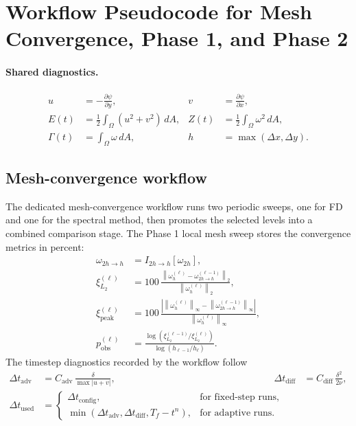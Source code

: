 \documentclass[11pt]{article}
\begin{document}
\section*{Workflow Pseudocode for Mesh Convergence, Phase 1, and Phase 2}

\paragraph{Shared diagnostics.}
\begin{align}
u &= -\frac{\partial \psi}{\partial y},
&
v &= \frac{\partial \psi}{\partial x},
\\
E(t) &= \frac{1}{2}\int_{\Omega}\left(u^2 + v^2\right)\,dA,
&
Z(t) &= \frac{1}{2}\int_{\Omega}\omega^2\,dA,
\\
\Gamma(t) &= \int_{\Omega}\omega\,dA,
&
h &= \max(\Delta x,\Delta y).
\end{align}

\subsection*{Mesh-convergence workflow}

The dedicated mesh-convergence workflow runs two periodic sweeps, one for FD and one for the spectral method, then promotes the selected levels into a combined comparison stage. The Phase 1 local mesh sweep stores the convergence metrics in percent:
\begin{align}
\omega_{2h \rightarrow h} &= I_{2h \rightarrow h}\!\left[\omega_{2h}\right],
\\
\xi_{L_2}^{(\ell)} &= 100\,
\frac{\left\|\omega_h^{(\ell)} - \omega_{2h \rightarrow h}^{(\ell-1)}\right\|_2}
{\left\|\omega_h^{(\ell)}\right\|_2},
\\
\xi_{\mathrm{peak}}^{(\ell)} &= 100\,
\frac{\left|\left\|\omega_h^{(\ell)}\right\|_{\infty} -
\left\|\omega_{2h \rightarrow h}^{(\ell-1)}\right\|_{\infty}\right|}
{\left\|\omega_h^{(\ell)}\right\|_{\infty}},
\\
p_{\mathrm{obs}}^{(\ell)} &=
\frac{\log\!\left(\xi_{L_2}^{(\ell-1)} / \xi_{L_2}^{(\ell)}\right)}
{\log\!\left(h_{\ell-1}/h_{\ell}\right)}.
\end{align}
The timestep diagnostics recorded by the workflow follow
\begin{align}
\Delta t_{\mathrm{adv}} &= C_{\mathrm{adv}}\,
\frac{\delta}{\max |u+v|},
&
\Delta t_{\mathrm{diff}} &= C_{\mathrm{diff}}\,
\frac{\delta^2}{2\nu},
\\
\Delta t_{\mathrm{used}} &=
\begin{cases}
\Delta t_{\mathrm{config}}, & \text{for fixed-step runs},\\
\min\!\left(\Delta t_{\mathrm{adv}}, \Delta t_{\mathrm{diff}}, T_f - t^n\right),
& \text{for adaptive runs}.
\end{cases}
\end{align}
\end{document}
